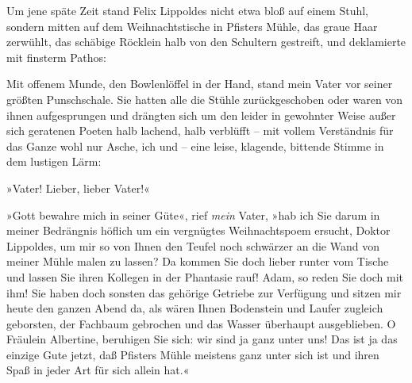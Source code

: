 Um jene späte Zeit stand Felix Lippoldes nicht etwa bloß auf einem
Stuhl, sondern mitten auf dem Weihnachtstische in Pfisters Mühle,
das graue Haar zerwühlt, das schäbige Röcklein halb von den
Schultern gestreift, und deklamierte mit finsterm Pathos:

Mit offenem Munde, den Bowlenlöffel in der Hand, stand mein Vater
vor seiner größten Punschschale. Sie hatten alle die Stühle
zurückgeschoben oder waren von ihnen aufgesprungen und drängten
sich um den leider in gewohnter Weise außer sich geratenen Poeten
halb lachend, halb verblüfft – mit vollem Verständnis für das Ganze
wohl nur Asche, ich und – eine leise, klagende, bittende Stimme in
dem lustigen Lärm:

»Vater! Lieber, lieber Vater!«

»Gott bewahre mich in seiner Güte«, rief \emph{mein} Vater, »hab
ich Sie darum in meiner Bedrängnis höflich um ein vergnügtes
Weihnachtspoem ersucht, Doktor Lippoldes, um mir so von Ihnen den
Teufel noch schwärzer an die Wand von meiner Mühle malen zu lassen?
Da kommen Sie doch lieber runter vom Tische und lassen Sie ihren
Kollegen in der Phantasie rauf! Adam, so reden Sie doch mit ihm!
Sie haben doch sonsten das gehörige Getriebe zur Verfügung und
sitzen mir heute den ganzen Abend da, als wären Ihnen Bodenstein
und Laufer zugleich geborsten, der Fachbaum gebrochen und das
Wasser überhaupt ausgeblieben. O Fräulein Albertine, beruhigen Sie
sich: wir sind ja ganz unter uns! Das ist ja das einzige Gute
jetzt, daß Pfisters Mühle meistens ganz unter sich ist und ihren
Spaß in jeder Art für sich allein hat.«

